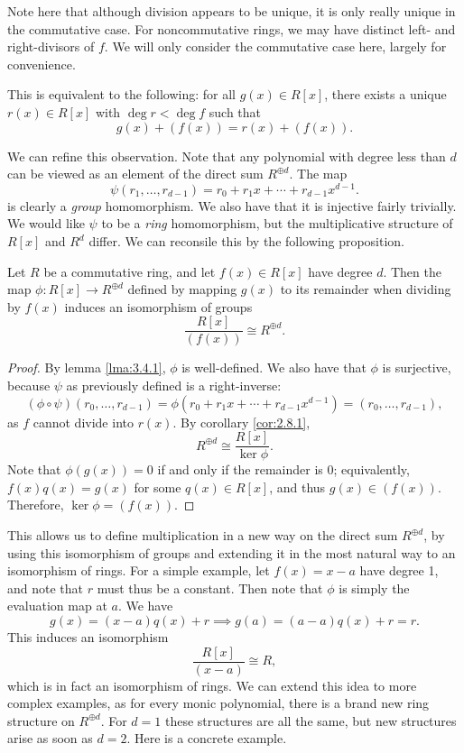 Note here that although division appears to be unique, it is only really unique in the commutative case. For noncommutative rings, we may have distinct left- and right-divisors of $f$. We will only consider the commutative case here, largely for convenience.

This is equivalent to the following: for all $g(x)\in R[x]$, there exists a unique $r(x)\in R[x]$ with $\operatorname{deg} r < \operatorname{deg} f$ such that
\[
	g(x)+(f(x))=r(x)+(f(x))
.\]

We can refine this observation. Note that any polynomial with degree less than $d$ can be viewed as an element of the direct sum $R ^{\oplus d}$. The map
\[
	\psi (r_1, \dots, r_{d-1}) = r_0 + r_1x + \cdots + r_{d-1}x ^{d-1}
.\]
is clearly a \emph{group} homomorphism. We also have that it is injective fairly trivially. We would like $\psi $ to be a \emph{ring} homomorphism, but the multiplicative structure of $R[x]$ and $R^d$ differ. We can reconsile this by the following proposition.
\begin{proposition}\label{prp:3.4.2}
	Let $R$ be a commutative ring, and let $f(x)\in R[x]$ have degree $d$. Then the map $\phi : R[x] \to R ^{\oplus d}$ defined by mapping $g(x)$ to its remainder when dividing by $f(x)$ induces an isomorphism of groups
	\[
		\frac{R[x]}{(f(x))}\cong R ^{\oplus d}
	.\]
\end{proposition}
\begin{proof}
	By lemma \ref{lma:3.4.1}, $\phi $ is well-defined. We also have that $\phi $ is surjective, because $\psi $ as previously defined is a right-inverse:
	\[
		(\phi \circ \psi  )(r_0, \dots, r_{d-1})=\phi (r_0+r_1x + \cdots + r_{d-1}x ^{d-1}) = (r_0, \dots, r_{d-1})
	,\]
	as $f$ cannot divide into $r(x)$. By corollary \ref{cor:2.8.1},
	\[
		R ^{\oplus d}\cong \frac{R[x]}{\ker \phi }
	.\]
	Note that $\phi (g(x))=0$ if and only if the remainder is $0$; equivalently, $f(x)q(x)=g(x)$ for some $q(x)\in R[x]$, and thus $g(x)\in (f(x))$. Therefore, $\ker \phi =(f(x))$.
\end{proof}

This allows us to define multiplication in a new way on the direct sum $R ^{\oplus d}$, by using this isomorphism of groups and extending it in the most natural way to an isomorphism of rings. For a simple example, let $f(x)=x-a$ have degree 1, and note that $r$ must thus be a constant. Then note that $\phi $ is simply the evaluation map at $a$. We have
\[
	g(x)=(x-a)q(x) + r \implies g(a)=(a-a)q(x) + r = r
.\]
This induces an isomorphism
\[
	\frac{R[x]}{(x-a)}\cong R
,\]
which is in fact an isomorphism of rings. We can extend this idea to more complex examples, as for every monic polynomial, there is a brand new ring structure on $R ^{\oplus d}$. For $d=1$ these structures are all the same, but new structures arise as soon as $d=2$. Here is a concrete example.

